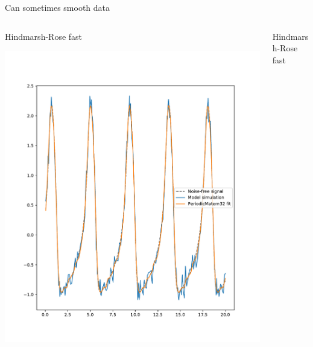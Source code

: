 \documentclass[presentation]{beamer}
\begin{document}
\begin{frame}[plain,label={sec:orgce8e801}]{Can sometimes smooth data}
\begin{columns}
\begin{column}{0.5\columnwidth}
\begin{center}
Hindmarsh-Rose fast
\end{center}

\begin{center}
\includegraphics[width=1.1\textwidth]{./Matern1.pdf}
\end{center}
\end{column}

\begin{column}{0.5\columnwidth}
\begin{center}
Hindmarsh-Rose fast
\end{center}


\end{column}
\end{columns}
\end{frame}
\end{document}
